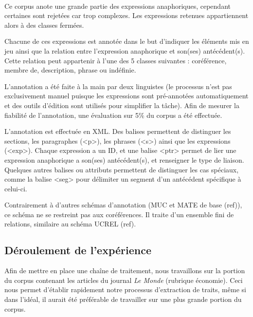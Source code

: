 \documentclass[a4paper,12pt]{article}
\begin{document}
\paragraph{}
Ce corpus anote une grande partie des expressions anaphoriques, cependant certaines sont rejetées car trop complexes. Les expressions retenues appartiennent alors à des classes fermées.

Chacune de ces expressions est annotée dans le but d'indiquer les éléments mis en jeu ainsi que la relation entre l'expression anaphorique et son(ses) antécédent(s). Cette relation peut appartenir à l'une des 5 classes suivantes : coréférence, membre de, description, phrase ou indéfinie.

L'annotation a été faite à la main par deux linguistes (le processus n'est pas exclusivement manuel puisque les expressions sont pré-annotées automatiquement et des outils d'édition sont utilisés pour simplifier la tâche). Afin de mesurer la fiabilité de l'annotation, une évaluation sur 5\% du corpus a été effectuée.

L'annotation est effectuée en XML. Des balises permettent de distinguer les sections, les paragraphes (<p>), les phrases (<s>) ainsi que les expressions (<exp>). Chaque expression a un ID, et une balise <ptr> permet de lier une expression anaphorique a son(ses) antécédent(s), et renseigner le type de liaison. Quelques autres balises ou attributs permettent de distinguer les cas spéciaux, comme la balise <seg> pour délimiter un segment d'un antécédent spécifique à celui-ci.

Contrairement à d'autres schémas d'annotation (MUC et MATE de base (ref)), ce schéma ne se restreint pas aux coréférences. Il traite d'un ensemble fini de relations, similaire au schéma UCREL (ref).


\subsection{Déroulement de l'expérience}


Afin de mettre en place une chaîne de traitement, nous travaillons sur la portion du corpus contenant les articles du journal \emph{Le Monde} (rubrique économie). Ceci nous permet d'établir rapidement notre processus d'extraction de traits, même si dans l'idéal, il aurait été préférable de travailler sur une plus grande portion du corpus.
\end{document}
